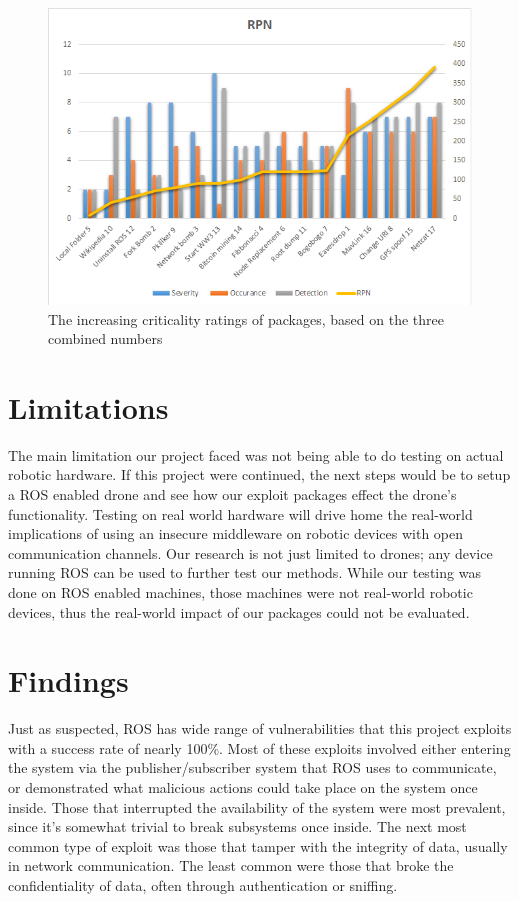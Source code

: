 \documentclass[IEEEtran,letterpaper,10pt,notitlepage,draftclsnofoot,onecolumn]{article}
\begin{document}
\begin{figure}[H]
    \centering
    \includegraphics[width=\textwidth]{RPN}
    \caption{The increasing criticality ratings of packages, based on the three combined numbers}
\end{figure}

\section{Limitations}
The main limitation our project faced was not being able to do testing on actual robotic hardware.
If this project were continued, the next steps would be to setup a ROS enabled drone and see how our exploit packages effect the drone's functionality.
Testing on real world hardware will drive home the real-world implications of using an insecure middleware on robotic devices with open communication channels.
Our research is not just limited to drones; any device running ROS can be used to further test our methods.
While our testing was done on ROS enabled machines, those machines were not real-world robotic devices, thus the real-world impact of our packages could not be evaluated.

\section{Findings}
Just as suspected, ROS has wide range of vulnerabilities that this project exploits with a success rate of nearly 100\%.
Most of these exploits involved either entering the system via the publisher/subscriber system that ROS uses to communicate, or demonstrated what malicious actions could take place on the system once inside.
Those that interrupted the availability of the system were most prevalent, since it's somewhat trivial to break subsystems once inside.
The next most common type of exploit was those that tamper with the integrity of data, usually in network communication.
The least common were those that broke the confidentiality of data, often through authentication or sniffing.
\end{document}
